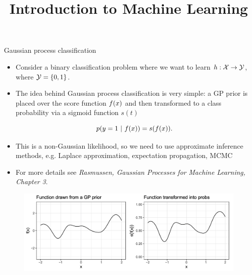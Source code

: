 




\newcommand{\titlefigure}{figure_man/gp-classification.png}
\newcommand{\learninggoals}{
  \item \textcolor{blue}{XXX}
  \item \textcolor{blue}{XXX}
}

\title{Introduction to Machine Learning}
\date{}




\begin{vbframe}{Gaussian process classification}

\begin{itemize}
\item Consider a binary classification problem where we want to learn $h: \mathcal{X} \to \mathcal{Y}$, where $\mathcal{Y} = \{0, 1\}$. 
\item The idea behind Gaussian process classification is very simple: a GP prior is placed over the score function $f(x)$ and then transformed to a class probability via a sigmoid function $s(t)$

$$
p(y = 1 ~|~ f(x) ) = s(f(x)).
$$

\item This is a non-Gaussian likelihood, so we need to use approximate inference methods, e.g. Laplace approximation, expectation propagation, MCMC 
\item For more details see \emph{Rasmussen, Gaussian Processes for Machine Learning, Chapter 3}.

\end{itemize}

\vspace*{1cm}

\begin{figure}
\includegraphics[width=1\textwidth]{figure_man/gp-classification.png}
\end{figure}


\end{vbframe}
